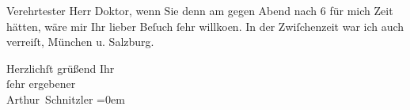 \pstart{}Verehrtester Herr Doktor,\pend\vspace{0.5em}
\pstart
           wenn Sie denn am \label{K_L02368-1v}\label{K_L02368-1} gegen Abend nach 6 für
               mich Zeit hätten, wäre mir Ihr lieber Beſuch{ }ſehr willko{\geminationm}en. In der Zwiſchenzeit war ich auch verreiſt, München u. Salzburg.\pend
           
\pstart
           Herzlichſt grüßend Ihr{\\[\baselineskip]}ſehr ergebener{\\[\baselineskip]}\spacefill\mbox{Arthur Schnitzler}\pend
           \leftskip=0em{}\endnumbering{}  \newcommand{\dateiname}{L02368}\newcommand{\titel}{Arthur Schnitzler an Robert Adam, 25. 5. 1921}\newcommand{\editorInnen}{Martin Anton Müller und Gerd-Hermann Susen}
